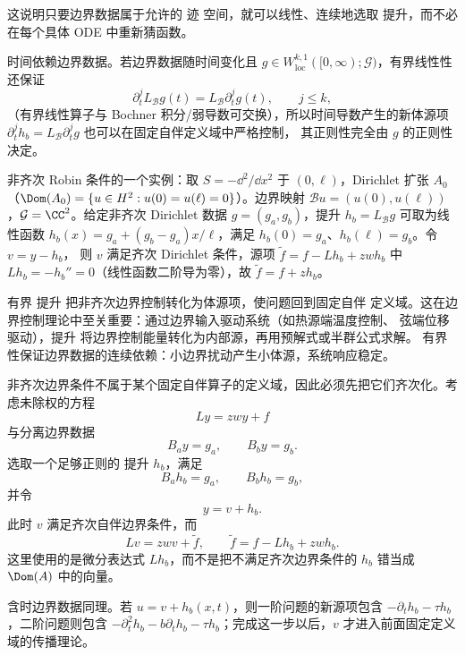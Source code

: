 这说明只要边界数据属于允许的 迹 空间，就可以线性、连续地选取 提升，而不必在每个具体 ODE 中重新猜函数。

时间依赖边界数据。若边界数据随时间变化且
$g\in W^{k,1}_{\mathrm{loc}}([0,\infty);\mathcal G)$，有界线性性还保证
\[
 \partial_t^jL_{\mathcal B}g(t)=L_{\mathcal B}\partial_t^jg(t),
 \qquad j\le k,
\]
（有界线性算子与 Bochner 积分/弱导数可交换），所以时间导数产生的新体源项
$\partial_t^j h_b=L_{\mathcal B}\partial_t^jg$ 也可以在固定自伴定义域中严格控制，
其正则性完全由 $g$ 的正则性决定。

非齐次 Robin 条件的一个实例：取 $S=-\dd^2/\dd x^2$ 于 $(0,\ell)$，Dirichlet 扩张
$A_0$（$\Dom(A_0)=\{u\in H^2:u(0)=u(\ell)=0\}$）。边界映射
$\mathcal B u=(u(0),u(\ell))$，$\mathcal G=\CC^2$。给定非齐次 Dirichlet 数据
$g=(g_a,g_b)$，提升 $h_b=L_{\mathcal B}g$ 可取为线性函数
$h_b(x)=g_a+(g_b-g_a)x/\ell$，满足 $h_b(0)=g_a$、$h_b(\ell)=g_b$。令 $v=y-h_b$，
则 $v$ 满足齐次 Dirichlet 条件，源项 $\widetilde f=f-Lh_b+zwh_b$ 中
$Lh_b=-h_b''=0$（线性函数二阶导为零），故 $\widetilde f=f+zh_b$。

有界 提升 把非齐次边界控制转化为体源项，使问题回到固定自伴
定义域。这在边界控制理论中至关重要：通过边界输入驱动系统（如热源端温度控制、
弦端位移驱动），提升 将边界控制能量转化为内部源，再用预解式或半群公式求解。
有界性保证边界数据的连续依赖：小边界扰动产生小体源，系统响应稳定。

非齐次边界条件不属于某个固定自伴算子的定义域，因此必须先把它们齐次化。考虑未除权的方程
\begin{equation*}Ly=zwy+f
\end{equation*}
与分离边界数据
\begin{equation*}B_ay=g_a,\qquad B_by=g_b.
\end{equation*}
选取一个足够正则的 提升 $h_b$，满足
\begin{equation*}B_ah_b=g_a,\qquad B_bh_b=g_b,
\end{equation*}
并令
\begin{equation*}y=v+h_b.
\end{equation*}
此时 $v$ 满足齐次自伴边界条件，而
\begin{equation*}Lv=zwv+\widetilde f,
 \qquad
 \widetilde f=f-Lh_b+zwh_b.
\end{equation*}
这里使用的是微分表达式 $Lh_b$，而不是把不满足齐次边界条件的 $h_b$ 错当成 $\Dom(A)$ 中的向量。

含时边界数据同理。若 $u=v+h_b(x,t)$，则一阶问题的新源项包含 $-\partial_t h_b-\tau h_b$，二阶问题则包含 $-\partial_t^2h_b-b\partial_t h_b-\tau h_b$；完成这一步以后，$v$ 才进入前面固定定义域的传播理论。

